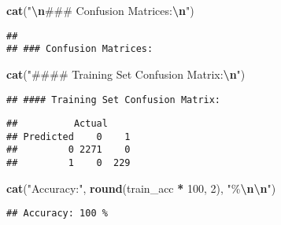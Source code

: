 \documentclass[
]{article}
\newenvironment{Shaded}{\begin{snugshade}}{\end{snugshade}}
\newcommand{\AttributeTok}[1]{\textcolor[rgb]{0.13,0.29,0.53}{#1}}
\newcommand{\DecValTok}[1]{\textcolor[rgb]{0.00,0.00,0.81}{#1}}
\newcommand{\FunctionTok}[1]{\textcolor[rgb]{0.13,0.29,0.53}{\textbf{#1}}}
\newcommand{\NormalTok}[1]{#1}
\newcommand{\OtherTok}[1]{\textcolor[rgb]{0.56,0.35,0.01}{#1}}
\newcommand{\SpecialCharTok}[1]{\textcolor[rgb]{0.81,0.36,0.00}{\textbf{#1}}}
\newcommand{\StringTok}[1]{\textcolor[rgb]{0.31,0.60,0.02}{#1}}
\begin{document}
\begin{Shaded}
\begin{Highlighting}[]
\FunctionTok{cat}\NormalTok{(}\StringTok{"}\SpecialCharTok{\textbackslash{}n}\StringTok{\#\#\# Confusion Matrices:}\SpecialCharTok{\textbackslash{}n}\StringTok{"}\NormalTok{)}
\end{Highlighting}
\end{Shaded}

\begin{verbatim}
## 
## ### Confusion Matrices:
\end{verbatim}

\begin{Shaded}
\begin{Highlighting}[]
\FunctionTok{cat}\NormalTok{(}\StringTok{"\#\#\#\# Training Set Confusion Matrix:}\SpecialCharTok{\textbackslash{}n}\StringTok{"}\NormalTok{)}
\end{Highlighting}
\end{Shaded}

\begin{verbatim}
## #### Training Set Confusion Matrix:
\end{verbatim}

\begin{Shaded}
\end{Shaded}

\begin{verbatim}
##          Actual
## Predicted    0    1
##         0 2271    0
##         1    0  229
\end{verbatim}

\begin{Shaded}
\begin{Highlighting}[]
\FunctionTok{cat}\NormalTok{(}\StringTok{"Accuracy:"}\NormalTok{, }\FunctionTok{round}\NormalTok{(train\_acc }\SpecialCharTok{*} \DecValTok{100}\NormalTok{, }\DecValTok{2}\NormalTok{), }\StringTok{"\%}\SpecialCharTok{\textbackslash{}n\textbackslash{}n}\StringTok{"}\NormalTok{)}
\end{Highlighting}
\end{Shaded}

\begin{verbatim}
## Accuracy: 100 %
\end{verbatim}
\end{document}
